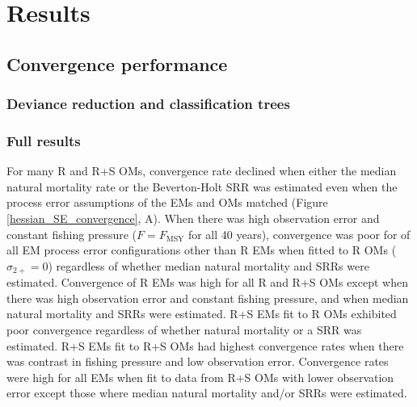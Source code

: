 \documentclass[
  12pt,
]{article}
\begin{document}
\hypertarget{results}{%
\section*{Results}\label{results}}

\hypertarget{convergence-performance}{%
\subsection*{Convergence performance}\label{convergence-performance}}

\hypertarget{deviance-reduction-and-classification-trees}{%
\subsubsection*{Deviance reduction and classification
trees}\label{deviance-reduction-and-classification-trees}}

\hypertarget{full-results}{%
\subsubsection*{Full results}\label{full-results}}

For many R and R+S OMs, convergence rate declined when either the median
natural mortality rate or the Beverton-Holt SRR was estimated even when
the process error assumptions of the EMs and OMs matched (Figure
\ref{hessian_SE_convergence}, A). When there was high observation error
and constant fishing pressure (\(F = F_{\text{MSY}}\) for all 40 years),
convergence was poor for of all EM process error configurations other
than R EMs when fitted to R OMs (\(\sigma_{2+} = 0\)) regardless of
whether median natural mortality and SRRs were estimated. Convergence of
R EMs was high for all R and R+S OMs except when there was high
observation error and constant fishing pressure, and when median natural
mortality and SRRs were estimated. R+S EMs fit to R OMs exhibited poor
convergence regardless of whether natural mortality or a SRR was
estimated. R+S EMs fit to R+S OMs had highest convergence rates when
there was contrast in fishing pressure and low observation error.
Convergence rates were high for all EMs when fit to data from R+S OMs
with lower observation error except those where median natural mortality
and/or SRRs were estimated.
\end{document}
